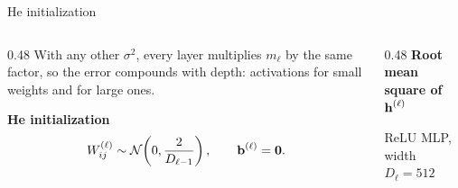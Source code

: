 \begin{frame}{He initialization}
	\small
	\setlength{\abovedisplayskip}{4pt}\setlength{\belowdisplayskip}{4pt}
	\begin{columns}[c,onlytextwidth]
		\begin{column}{0.48\textwidth}
			With any other $\sigma^2$, every layer multiplies $m_\ell$ by the same factor, so the error compounds with depth: activations  for small weights and  for large ones.

			\medskip

			\begin{tcolorbox}[nndsblue,boxsep=1mm,top=1mm,bottom=1mm]
				\textbf{\color{darkcerulean}He initialization}
				\[
					W^{(\ell)}_{ij}\sim\mathcal{N}\!\left(0,\frac{2}{D_{\ell-1}}\right),
					\qquad \boldsymbol{\mathbf{b}}^{(\ell)}=\boldsymbol{\mathbf{0}}.
				\]
			\end{tcolorbox}
		\end{column}
		\begin{column}{0.48\textwidth}
			\centering
			\textbf{\color{darkcerulean}Root mean square of $\boldsymbol{\mathbf{h}}^{(\ell)}$}\par
			{\scriptsize\color{drawgray}ReLU MLP, width $D_\ell=512$}\par
			\medskip
			
		\end{column}
	\end{columns}
\end{frame}

